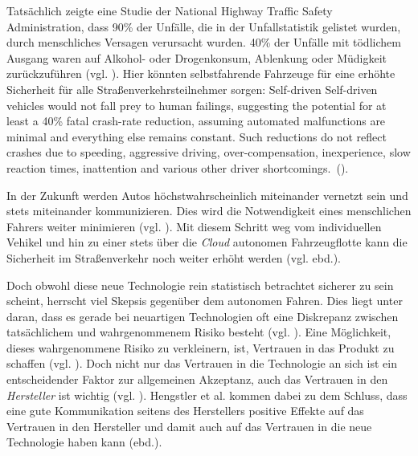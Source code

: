 Tatsächlich zeigte eine Studie der National Highway Traffic Safety Administration, dass 90\% der Unfälle, die in der Unfallstatistik gelistet wurden, durch menschliches Versagen verursacht wurden. 40\% der Unfälle mit tödlichem Ausgang waren auf Alkohol- oder Drogenkonsum, Ablenkung oder Müdigkeit zurückzuführen (vgl. \cite{singh2015critical}). Hier könnten selbstfahrende Fahrzeuge für eine erhöhte Sicherheit für alle Straßenverkehrsteilnehmer sorgen: \glqq Self-driven Self-driven vehicles would not fall prey to human failings, suggesting the potential for at least a 40\% fatal crash-rate reduction, assuming automated malfunctions are minimal and everything else remains constant. Such reductions do not reflect crashes due to speeding, aggressive driving, over-compensation, inexperience, slow reaction times, inattention and various other driver shortcomings.\grqq \ (\cite[169]{fagnant2015preparing}).

In der Zukunft werden Autos höchstwahrscheinlich miteinander vernetzt sein und stets miteinander kommunizieren. Dies wird die Notwendigkeit eines menschlichen Fahrers weiter minimieren (vgl. \cite[241]{gerla2014internet}). Mit diesem Schritt weg vom individuellen Vehikel und hin zu einer stets über die \emph{Cloud} autonomen Fahrzeugflotte kann die Sicherheit im Straßenverkehr noch weiter erhöht werden (vgl. ebd.).

Doch obwohl diese neue Technologie rein statistisch betrachtet sicherer zu sein scheint, herrscht viel Skepsis gegenüber dem autonomen Fahren. Dies liegt unter daran, dass es gerade bei neuartigen Technologien oft eine Diskrepanz zwischen tatsächlichem und wahrgenommenem Risiko besteht (vgl. \cite[106]{hengstler2016applied}). Eine Möglichkeit, dieses wahrgenommene Risiko zu verkleinern, ist, Vertrauen in das Produkt zu schaffen (vgl. \cite{rousseau1998not}). Doch nicht nur das Vertrauen in die Technologie an sich ist ein entscheidender Faktor zur allgemeinen Akzeptanz, auch das Vertrauen in den \emph{Hersteller} ist wichtig (vgl. \cite[107]{hengstler2016applied}). Hengstler et al. kommen dabei zu dem Schluss, dass eine gute Kommunikation seitens des Herstellers positive Effekte auf das Vertrauen in den Hersteller und damit auch auf das Vertrauen in die neue Technologie haben kann (ebd.).
